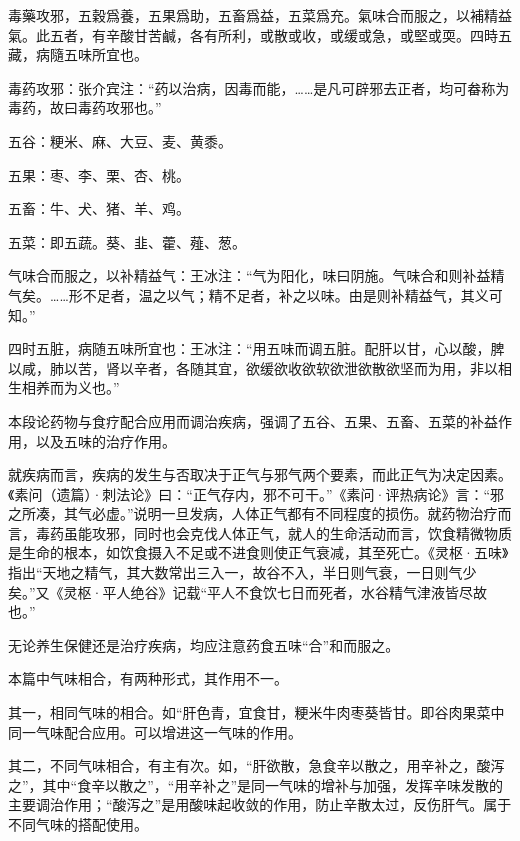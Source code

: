 \documentclass[draft,12pt]{ctexbook}
\begin{document}
\begin{yuanwen}
毒藥攻邪，五穀爲養，五果爲助，五畜爲益，五菜爲充。氣味合而服之，以補精益氣。此五者，有辛酸甘苦鹹，各有所利，或散或收，或缓或急，或堅或耎。四時五藏，病隨五味所宜也。
\end{yuanwen}


\begin{jiaozhu}
	\item 毒药攻邪：张介宾注：“药以治病，因毒而能，……是凡可辟邪去正者，均可畚称为毒药，故曰毒药攻邪也。”
	\item 五谷：粳米、麻、大豆、麦、黄黍。
	\item 五果：枣、李、栗、杏、桃。
	\item 五畜：牛、犬、猪、羊、鸡。
	\item 五菜：即五蔬。葵、韭、藿、薤、葱。
	\item 气味合而服之，以补精益气：王冰注：“气为阳化，味曰阴施。气味合和则补益精气矣。……形不足者，温之以气；精不足者，补之以味。由是则补精益气，其义可知。”
	\item 四时五脏，病随五味所宜也：王冰注：“用五味而调五脏。配肝以甘，心以酸，脾以咸，肺以苦，肾以辛者，各随其宜，欲缓欲收欲软欲泄欲散欲坚而为用，非以相生相养而为义也。”
\end{jiaozhu}



本段论药物与食疗配合应用而调治疾病，强调了五谷、五果、五畜、五菜的补益作用，以及五味的治疗作用。

就疾病而言，疾病的发生与否取决于正气与邪气两个要素，而此正气为决定因素。《素问（遗篇）·刺法论》曰：“正气存内，邪不可干。”《素问·评热病论》言：“邪之所凑，其气必虚。”说明一旦发病，人体正气都有不同程度的损伤。就药物治疗而言，毒药虽能攻邪，同时也会克伐人体正气，就人的生命活动而言，饮食精微物质是生命的根本，如饮食摄入不足或不进食则使正气衰减，其至死亡。《灵枢·五味》指出“天地之精气，其大数常出三入一，故谷不入，半日则气衰，一日则气少矣。”又《灵枢·平人绝谷》记载“平人不食饮七日而死者，水谷精气津液皆尽故也。”

无论养生保健还是治疗疾病，均应注意药食五味“合”和而服之。

本篇中气味相合，有两种形式，其作用不一。

其一，相同气味的相合。如“肝色青，宜食甘，粳米牛肉枣葵皆甘。即谷肉果菜中同一气味配合应用。可以增进这一气味的作用。

其二，不同气味相合，有主有次。如，“肝欲散，急食辛以散之，用辛补之，酸泻之”，其中“食辛以散之”，“用辛补之”是同一气味的增补与加强，发挥辛味发散的主要调治作用；“酸泻之”是用酸味起收敛的作用，防止辛散太过，反伤肝气。属于不同气味的搭配使用。
\end{document}
